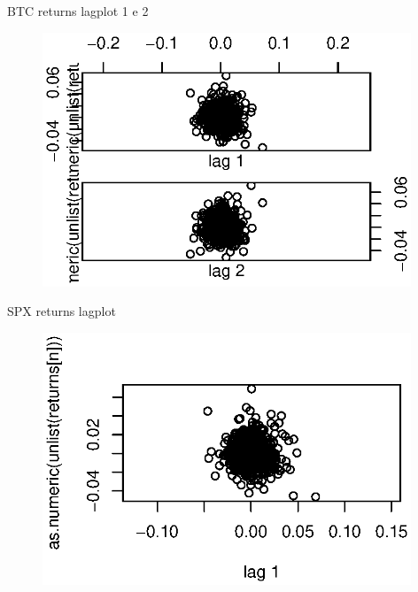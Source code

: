 \documentclass{beamer}
\begin{document}
\begin{frame}{BTC returns lagplot 1 e 2}
	\begin{figure}[linewidth=250mm]	
		\includegraphics[width=110mm]{BTClagplot2.eps}
	\end{figure}
\end{frame}
\begin{frame}{SPX returns lagplot}
	\begin{figure}[b]	
		\includegraphics[width=110mm]{S&P500lagplot.eps}
	\end{figure}
\end{frame}
\end{document}
